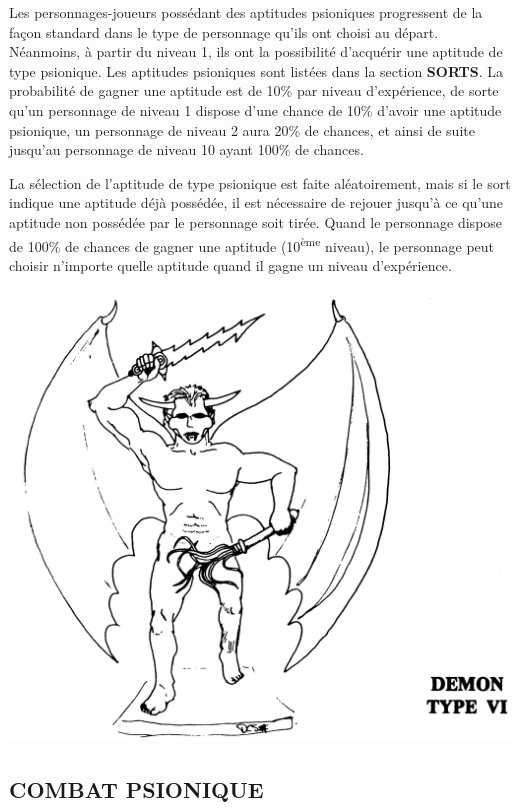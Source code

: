 {Les personnages-joueurs possédant des aptitudes psioniques progressent de la façon standard dans le type de personnage qu'ils ont choisi au départ. Néanmoins, à partir du niveau 1, ils ont la possibilité d'acquérir une aptitude de type psionique. Les aptitudes psioniques sont listées dans la section \textbf{SORTS}. La probabilité de gagner une aptitude est de 10\% par niveau d'expérience, de sorte qu'un personnage de niveau 1 dispose d'une chance de 10\% d'avoir une aptitude psionique, un personnage de niveau 2 aura 20\% de chances, et ainsi de suite jusqu'au personnage de niveau 10 ayant 100\% de chances.

\bigskip

La sélection de l'aptitude de type psionique est faite aléatoirement, mais si le sort indique une aptitude déjà possédée, il est nécessaire de rejouer  jusqu'à ce qu'une aptitude non possédée par le personnage soit tirée. Quand le personnage dispose de 100\% de chances de gagner une aptitude (10\textsuperscript{ème} niveau), le personnage peut choisir n'importe quelle aptitude quand il gagne un niveau d'expérience.

\begin{center}
\includegraphics[scale=0.17]{./images/demon-typeVI.jpg}
\end{center}

\subsection*{\normalsize COMBAT PSIONIQUE}

}

